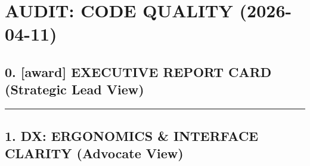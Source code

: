 \chapter{AUDIT: CODE QUALITY (2026-04-11)}\label{record-413}

\smallskip

\section{0. {[}award{]} EXECUTIVE REPORT CARD (Strategic Lead View)}\label{record-413-award-executive-report-card-strategic-lead-view}



\begin{center}\rule{0.5\linewidth}{0.5pt}\end{center}

\section{1. DX: ERGONOMICS \& INTERFACE CLARITY (Advocate View)}\label{record-413-dx-ergonomics-interface-clarity-advocate-view}

